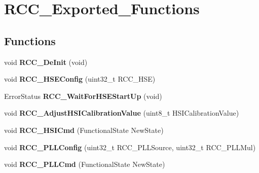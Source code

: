 \hypertarget{group__RCC__Exported__Functions}{
\section{RCC\_\-Exported\_\-Functions}
\label{group__RCC__Exported__Functions}
}
\subsection*{Functions}
\begin{DoxyCompactItemize}
\item 
\hypertarget{group__RCC__Exported__Functions_ga413f6422be11b1334abe60b3bff2e062}{
void {\bfseries RCC\_\-DeInit} (void)}
\label{group__RCC__Exported__Functions_ga413f6422be11b1334abe60b3bff2e062}

\item 
\hypertarget{group__RCC__Exported__Functions_ga432b3281546d23345642d55f8670a93d}{
void {\bfseries RCC\_\-HSEConfig} (uint32\_\-t RCC\_\-HSE)}
\label{group__RCC__Exported__Functions_ga432b3281546d23345642d55f8670a93d}

\item 
\hypertarget{group__RCC__Exported__Functions_gae0f15692614dd048ee4110a056f001dc}{
ErrorStatus {\bfseries RCC\_\-WaitForHSEStartUp} (void)}
\label{group__RCC__Exported__Functions_gae0f15692614dd048ee4110a056f001dc}

\item 
\hypertarget{group__RCC__Exported__Functions_gaa2d6a35f5c2e0f86317c3beb222677fc}{
void {\bfseries RCC\_\-AdjustHSICalibrationValue} (uint8\_\-t HSICalibrationValue)}
\label{group__RCC__Exported__Functions_gaa2d6a35f5c2e0f86317c3beb222677fc}

\item 
\hypertarget{group__RCC__Exported__Functions_ga0c6772a1e43765909495f57815ef69e2}{
void {\bfseries RCC\_\-HSICmd} (FunctionalState NewState)}
\label{group__RCC__Exported__Functions_ga0c6772a1e43765909495f57815ef69e2}

\item 
\hypertarget{group__RCC__Exported__Functions_ga0f67634cbe721f2c42f022d2a93229c8}{
void {\bfseries RCC\_\-PLLConfig} (uint32\_\-t RCC\_\-PLLSource, uint32\_\-t RCC\_\-PLLMul)}
\label{group__RCC__Exported__Functions_ga0f67634cbe721f2c42f022d2a93229c8}

\item 
\hypertarget{group__RCC__Exported__Functions_ga84dee53c75e58fdb53571716593c2272}{
void {\bfseries RCC\_\-PLLCmd} (FunctionalState NewState)}
\label{group__RCC__Exported__Functions_ga84dee53c75e58fdb53571716593c2272}


\end{DoxyCompactItemize}
